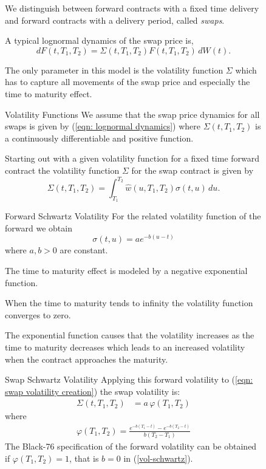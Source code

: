 \begin{figure}[htp]
	We distinguish between forward contracts with a fixed time delivery
	and forward contracts with a delivery period, called \emph{swaps}. 

	A typical lognormal dynamics of the swap price is, 
	\begin{equation}
	dF(t,T_{1},T_{2})=\Sigma(t,T_{1},T_{2})F(t,T_{1},T_{2})\, dW(t).\label{eqn: lognormal dynamics}
	\end{equation}
	
	The only parameter in this model is the volatility function $\Sigma$
	which has to capture all movements of the swap price and especially
	the time to maturity effect.

Volatility Functions 
	We assume that the swap price dynamics for
	all swaps is given by (\ref{eqn: lognormal dynamics}) where $\Sigma(t,T_{1},T_{2})$
	is a continuously differentiable and positive function.

	Starting out with a given volatility function for a fixed time forward
	contract the volatility function $\Sigma$ for the swap contract is
	given by 
	\begin{equation}
	\Sigma(t,T_{1},T_{2})=\int_{T_{1}}^{T_{2}}\hat{w}(u,T_{1},T_{2})\sigma(t,u)\, du.\label{eqn: swap volatility creation}
	\end{equation}


Forward Schwartz Volatility 
	For the related volatility function of the forward we obtain 
	\begin{equation}
	\sigma(t,u)=ae^{-b(u-t)}\label{vol-schwartz}
	\end{equation}
	where $a,b>0$ are constant. 

	The time to maturity effect is modeled by a negative exponential
	function. 

	When the time to maturity tends to infinity the volatility function
	converges to zero. 

	The exponential function causes that the volatility increases as the
	time to maturity decreases which leads to an increased volatility
	when the contract approaches the maturity. 


Swap Schwartz Volatility
	Applying this forward volatility to (\ref{eqn: swap volatility creation}) the swap volatility is: 
		\begin{align}
		\Sigma(t,T_{1},T_{2}) & =a\,\varphi(T_{1},T_{2})
		\end{align}
		where 
		\begin{align}
		\varphi(T_{1},T_{2})=\frac{e^{-b(T_{1}-t)}-e^{-b(T_{2}-t)}}{b(T_{2}-T_{1})}\label{volatility function varphi}
		\end{align}
	The Black-76 specification of the forward volatility can be obtained
	if $\varphi(T_{1},T_{2})=1$, that is $b=0$ in (\ref{vol-schwartz}).


\end{figure}
